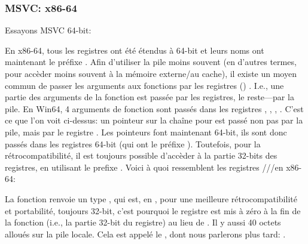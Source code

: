 \subsubsection{MSVC: x86-64}

Essayons MSVC 64-bit:




En x86-64, tous les registres ont été étendus à 64-bit et leurs noms ont maintenant le préfixe .
Afin d'utiliser la pile moins souvent (en d'autres termes, pour accèder moins souvent à la mémoire externe/au cache),
il existe un moyen commun de passer les arguments aux fonctions par les registres () .
I.e., une partie des arguments de la fonction est passée par les registres, le reste---par la pile.
En Win64, 4 arguments de fonction sont passés dans les registres \RCX, \RDX, , .
C'est ce que l'on voit ci-dessus: un pointeur sur la chaîne pour \printf est passé non pas par la pile,
mais par le registre \RCX.
Les pointeurs font maintenant 64-bit, ils sont donc passés dans les registres 64-bit (qui ont le préfixe ).
Toutefois, pour la rétrocompatibilité, il est toujours possible d'accèder à la partie 32-bits des registres,
en utilisant le prefixe .
Voici à quoi ressemblent les registres \RAX/\EAX/\AX/\AL en x86-64:


La fonction \main renvoie un type \Tint{}, qui est, en \CCpp, pour une meilleure rétrocompatibilité
et portabilité, toujours 32-bit, c'est pourquoi le registre \EAX est mis à zéro à la fin de la fonction (i.e., la
partie 32-bit du registre) au lieu de \RAX{}.
Il y aussi 40 octets alloués sur la pile locale.
Cela est appelé le , dont nous parlerons plus tard: .
